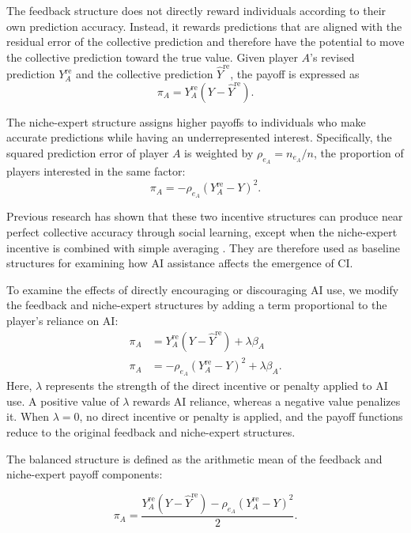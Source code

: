 \documentclass[12pt]{article}
\begin{document}
The feedback structure does not directly reward individuals according to their own prediction accuracy. Instead, it rewards predictions that are aligned with the residual error of the collective prediction and therefore have the potential to move the collective prediction toward the true value. Given player $A$'s revised prediction $Y_A^{\mathrm{re}}$ and the collective prediction $\hat{Y}^{\mathrm{re}}$, the payoff is expressed as
\begin{equation}
\pi_A = Y_A^{\mathrm{re}}(Y-\hat{Y}^{\mathrm{re}}).
\end{equation}

The niche-expert structure assigns higher payoffs to individuals who make accurate predictions while having an underrepresented interest. Specifically, the squared prediction error of player $A$ is weighted by $\rho_{e_A}=n_{e_A}/n$, the proportion of players interested in the same factor:
\begin{equation}
\pi_A = -\rho_{e_A}(Y_A^{\mathrm{re}}-Y)^2.
\end{equation}

Previous research has shown that these two incentive structures can produce near perfect collective accuracy through social learning, except when the niche-expert incentive is combined with simple averaging \citep{wang2025individual}. They are therefore used as baseline structures for examining how AI assistance affects the emergence of CI.

To examine the effects of directly encouraging or discouraging AI use, we modify the feedback and niche-expert structures by adding a term proportional to the player's reliance on AI:
\begin{align}
\pi_A &= Y_A^{\mathrm{re}}(Y-\hat{Y}^{\mathrm{re}}) + \lambda\beta_A\\
\pi_A &= -\rho_{e_A}(Y_A^{\mathrm{re}}-Y)^2 + \lambda\beta_A.
\end{align}
Here, $\lambda$ represents the strength of the direct incentive or penalty applied to AI use. A positive value of $\lambda$ rewards AI reliance, whereas a negative value penalizes it. When $\lambda=0$, no direct incentive or penalty is applied, and the payoff functions reduce to the original feedback and niche-expert structures.

The balanced structure is defined as the arithmetic mean of the feedback and niche-expert payoff components:

\begin{equation}
\pi_A = \frac{Y_A^{\mathrm{re}}(Y-\hat{Y}^{\mathrm{re}}) - \rho_{e_A}(Y_A^{\mathrm{re}}-Y)^2}{2}.
\end{equation}
\end{document}
